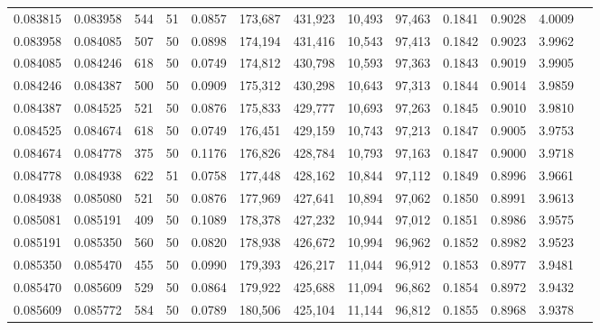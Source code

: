 \begin{tabular}{rrrrrrrrrrrrr}
0.083815 & 0.083958 &   544 &  51 &                                     0.0857 & 173,687 & 431,923 &  10,493 &  97,463 & 0.1841 & 0.9028 & 4.0009 \\
0.083958 & 0.084085 &   507 &  50 &                                     0.0898 & 174,194 & 431,416 &  10,543 &  97,413 & 0.1842 & 0.9023 & 3.9962 \\
0.084085 & 0.084246 &   618 &  50 &                                     0.0749 & 174,812 & 430,798 &  10,593 &  97,363 & 0.1843 & 0.9019 & 3.9905 \\
0.084246 & 0.084387 &   500 &  50 &                                     0.0909 & 175,312 & 430,298 &  10,643 &  97,313 & 0.1844 & 0.9014 & 3.9859 \\
0.084387 & 0.084525 &   521 &  50 &                                     0.0876 & 175,833 & 429,777 &  10,693 &  97,263 & 0.1845 & 0.9010 & 3.9810 \\
0.084525 & 0.084674 &   618 &  50 &                                     0.0749 & 176,451 & 429,159 &  10,743 &  97,213 & 0.1847 & 0.9005 & 3.9753 \\
0.084674 & 0.084778 &   375 &  50 &                                     0.1176 & 176,826 & 428,784 &  10,793 &  97,163 & 0.1847 & 0.9000 & 3.9718 \\
0.084778 & 0.084938 &   622 &  51 &                                     0.0758 & 177,448 & 428,162 &  10,844 &  97,112 & 0.1849 & 0.8996 & 3.9661 \\
0.084938 & 0.085080 &   521 &  50 &                                     0.0876 & 177,969 & 427,641 &  10,894 &  97,062 & 0.1850 & 0.8991 & 3.9613 \\
0.085081 & 0.085191 &   409 &  50 &                                     0.1089 & 178,378 & 427,232 &  10,944 &  97,012 & 0.1851 & 0.8986 & 3.9575 \\
0.085191 & 0.085350 &   560 &  50 &                                     0.0820 & 178,938 & 426,672 &  10,994 &  96,962 & 0.1852 & 0.8982 & 3.9523 \\
0.085350 & 0.085470 &   455 &  50 &                                     0.0990 & 179,393 & 426,217 &  11,044 &  96,912 & 0.1853 & 0.8977 & 3.9481 \\
0.085470 & 0.085609 &   529 &  50 &                                     0.0864 & 179,922 & 425,688 &  11,094 &  96,862 & 0.1854 & 0.8972 & 3.9432 \\
0.085609 & 0.085772 &   584 &  50 &                                     0.0789 & 180,506 & 425,104 &  11,144 &  96,812 & 0.1855 & 0.8968 & 3.9378 \\

\end{tabular}
